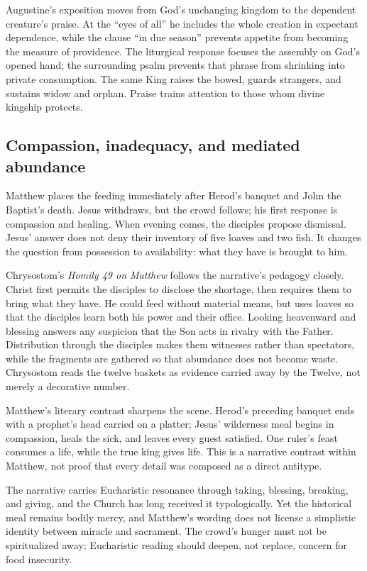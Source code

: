 Augustine's exposition moves from God's unchanging kingdom to the dependent
creature's praise. At the ``eyes of all'' he includes the whole creation in
expectant dependence, while the clause ``in due season'' prevents appetite
from becoming the measure of providence. The liturgical response focuses the
assembly on God's opened hand; the surrounding psalm prevents that phrase
from shrinking into private consumption. The same King raises the bowed,
guards strangers, and sustains widow and orphan. Praise trains attention to
those whom divine kingship protects.

\subsection*{Compassion, inadequacy, and mediated abundance\enspace{}}
Matthew places the feeding immediately after Herod's banquet and John the Baptist's death. Jesus withdraws, but the crowd follows; his first response is compassion and healing. When evening comes, the disciples propose dismissal. Jesus' answer does not deny their inventory of five loaves and two fish. It changes the question from possession to availability: what they have is brought to him.

Chrysostom's \emph{Homily 49 on Matthew} follows the narrative's pedagogy
closely. Christ first permits the disciples to disclose the shortage, then
requires them to bring what they have. He could feed without material means,
but uses loaves so that the disciples learn both his power and their office.
Looking heavenward and blessing answers any suspicion that the Son acts in
rivalry with the Father. Distribution through the disciples makes them
witnesses rather than spectators, while the fragments are gathered so that
abundance does not become waste. Chrysostom reads the twelve baskets as
evidence carried away by the Twelve, not merely a decorative number.

Matthew's literary contrast sharpens the scene. Herod's preceding banquet
ends with a prophet's head carried on a platter; Jesus' wilderness meal begins
in compassion, heals the sick, and leaves every guest satisfied. One ruler's
feast consumes a life, while the true king gives life. This is a narrative
contrast within Matthew, not proof that every detail was composed as a direct
antitype.

The narrative carries Eucharistic resonance through taking, blessing, breaking, and giving, and the Church has long received it typologically. Yet the historical meal remains bodily mercy, and Matthew's wording does not license a simplistic identity between miracle and sacrament. The crowd's hunger must not be spiritualized away; Eucharistic reading should deepen, not replace, concern for food insecurity.

